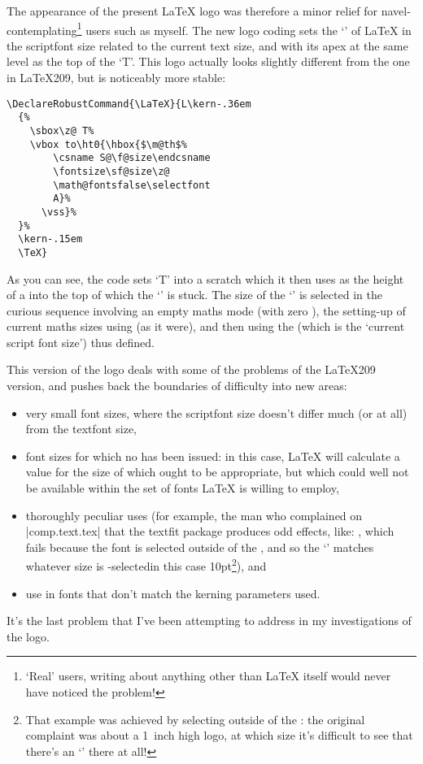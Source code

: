 \begin{Article}
  The appearance of the present \LaTeX{} logo was therefore a minor
  relief for navel-contemplating\footnote{`Real' users, writing about
    anything other than \LaTeX{} itself would never have noticed the
    problem!} users such as myself.  The new logo coding sets the `'
  of \LaTeX{} in the scriptfont size related to the current text size,
  and with its apex at the same level as the top of the `T'.  This
  logo actually looks slightly different from the one in \LaTeX209{},
  but is noticeably more stable:
\begin{verbatim}
\DeclareRobustCommand{\LaTeX}{L\kern-.36em
  {%
    \sbox\z@ T%
    \vbox to\ht0{\hbox{$\m@th$%
        \csname S@\f@size\endcsname
        \fontsize\sf@size\z@
        \math@fontsfalse\selectfont
        A}%
      \vss}%
  }%
  \kern-.15em
  \TeX}
\end{verbatim}
  As you can see, the code sets `T' into a scratch  which it
  then uses as the height of a  into the top of which the `'
  is stuck.  The size of the `' is selected in the curious sequence
  involving an empty maths mode (with zero ), the
  setting-up of current maths sizes using 
  (as it were), and then using the  (which is the `current
  script font size') thus defined.

  This version of the logo deals with some of the problems of the
  \LaTeX209{} version, and pushes back the boundaries of difficulty into
  new areas:
  \begin{itemize}
  \setlength{\itemsep}{0pt}%
  \item very small font sizes, where the scriptfont size doesn't
    differ much (or at all) from the textfont size,
  \item font sizes for which no  has been issued:
    in this case, \LaTeX{} will calculate a value for the size of
     which ought to be appropriate, but which could
    well not be available within the set of fonts \LaTeX{} is willing
    to employ,
  \item thoroughly peculiar uses (for example, the man who complained
    on \Newsgroup|comp.text.tex| that the \textsf{textfit} package
    produces odd effects, like:
    {{\huge\global\edef\grumble{\the\font}}\grumble\stdLaTeX},
    which fails because the font is selected outside of the
    , and so the `' matches whatever size is
    -selected\Dash in this case 10pt\footnote{That example
      was achieved by selecting  outside of the :
      the original complaint was about a 1~inch high logo, at which
      size it's difficult to see that there's an `' there at all!}),
    and
  \item use in fonts that don't match the kerning parameters used.
  \end{itemize}
  It's the last problem that I've been attempting to address in my
  investigations of the logo.


\end{Article}
